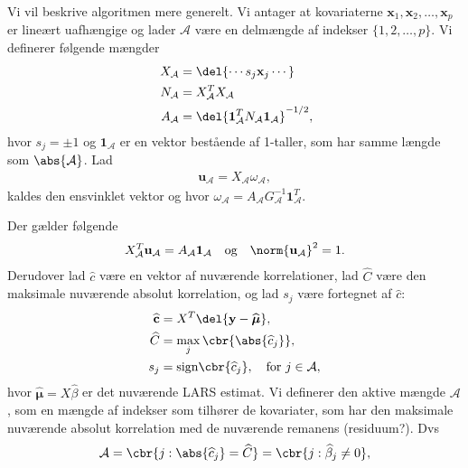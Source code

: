 Vi vil beskrive algoritmen mere generelt.
Vi antager at kovariaterne $ \textbf{x}_1,  \textbf{x}_2,  \dots,  \textbf{x}_p$ er lineært uafhængige og lader $\mathcal{A}$ være en delmængde af indekser $\{1, 2, \dots, p \}$. 
Vi definerer følgende mængder 
%
\begin{align*}
X_{\mathcal{A}} & = \del{\cdots s_j \textbf{x}_j \cdots}  \nonumber \\ 
N_{\mathcal{A}} & = X^T_{\mathcal{A}} X_{\mathcal{A}} \\ \
A_{\mathcal{A}} & = \del{ \textbf{1}^T_{\mathcal{A}} N_{\mathcal{A}} \textbf{1}_{\mathcal{A}} }^{- 1/2} , \nonumber 
\end{align*}
%
hvor  $s_j = \pm 1$ og $\textbf{1}_{\mathcal{A}} $ er en vektor bestående af 1-taller, som har samme længde som $\abs{\mathcal{A}}$. 
Lad 
%
\begin{align*}
\textbf{u}_{\mathcal{A}} = X_{\mathcal{A}} \omega_{\mathcal{A}}, 
\end{align*}
%
kaldes den ensvinklet vektor og hvor $ \omega_{\mathcal{A}} = A_{\mathcal{A}} G^{-1}_{\mathcal{A}}  \textbf{1}^T_{\mathcal{A}}$. 

Der gælder følgende 
%
 \begin{align*}
 X^T_{\mathcal{A}} \textbf{u}_{\mathcal{A}} = A_{\mathcal{A}}  \textbf{1}_{\mathcal{A}}   \quad  \text{og} \quad \norm{ \textbf{u}_{\mathcal{A}}}^2 = 1.
\end{align*}  
%
Derudover lad $\widehat{c}$ være en vektor af nuværende korrelationer, lad $\widehat{C}$ være den maksimale nuværende absolut korrelation, og lad $s_j$ være fortegnet af $\widehat{c}$: 
%
\begin{align*}
 \widehat{\textbf{c}} & = X^T \del{ \textbf{y}- \widehat{\boldsymbol{\mu}}}, \\
 \widehat{C} & = \max_j \cbr{\abs{\widehat{c}_j}}, \\
 s_j &  = \text{sign} \cbr{\widehat{c}_j}, \quad \text{for } j \in \mathcal{A},
\end{align*}
%
hvor $\widehat{\boldsymbol{\mu}} = X \widehat{\beta}$ er det nuværende LARS estimat. Vi definerer den aktive mængde $\mathcal{A}$, som en mængde af indekser som tilhører de kovariater, som har den maksimale nuværende absolut korrelation med de nuværende remanens (residuum?).  Dvs 
\begin{align*}
\mathcal{A} = \cbr{j : \abs{\widehat{c}_j} = \widehat{C}} = \cbr{j : \widehat{\beta}_j \neq 0},
\end{align*}

